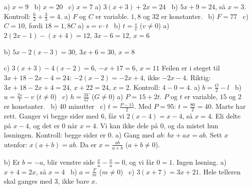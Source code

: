  a) $x = 9$ \ b) $x = 20$ \ c) $x = 7$
 a) $3(x+3) + 2x = 24$ \ b) $5x + 9 = 24$, så $x = 3$. Kontroll: $\frac{6}{2} + \frac{3}{3} = 4$.
 a) $F$ og $C$ er variable. $1{,}8$ og $32$ er konstanter. \ b) $F = 77$ \ c) $C = 10$, fordi $18 = 1{,}8C$
 a) $s = v \cdot t$ \ b) $t = \frac{s}{v}$ ($v \neq 0$)
 a) $2(2x-1) - (x+4) = 12$, $3x - 6 = 12$, $x = 6$\par
b) $5x - 2(x-3) = 30$, $3x + 6 = 30$, $x = 8$\par
c) $3(x+3) - 4(x-2) = 6$, $-x + 17 = 6$, $x = 11$
 Feilen er i steget til $3x + 18 - 2x - 4 = 24$: $-2(x-2) = -2x + 4$, ikke $-2x - 4$. Riktig: $3x + 18 - 2x + 4 = 24$, $x + 22 = 24$, $x = 2$. Kontroll: $4 - 0 = 4$.
 a) $b = \frac{O}{2} - l$ \ b) $u = \frac{2s}{t} - v$ ($t \neq 0$) \ c) $h = \frac{3V}{G}$ ($G \neq 0$)
 a) $P = 15 + 2t$. $P$ og $t$ er variable, $15$ og $2$ er konstanter. \ b) 40 minutter \ c) $t = \frac{P-15}{2}$. Med $P = 95$: $t = \frac{80}{2} = 40$.
 Marte har rett. Ganger vi begge sider med 6, får vi $2(x-4) = x-4$, så $x = 4$. Eli delte på $x-4$, og det er 0 når $x = 4$. Vi kan ikke dele på 0, og da mistet hun løsningen. Kontroll: begge sider er $0$.
 a) Gang med $ab$: $bx + ax = ab$. Sett $x$ utenfor: $x(a+b) = ab$. Da er $x = \frac{ab}{a+b}$ ($a + b \neq 0$).\par
b) Er $b = -a$, blir venstre side $\frac{x}{a} - \frac{x}{a} = 0$, og vi får $0 = 1$. Ingen løsning.
 a) $x + 4 = 2x$, så $x = 4$ \ b) $a = \frac{F}{m}$ ($m \neq 0$) \ c) $3(x+7) = 3x + 21$. Hele telleren skal ganges med 3, ikke bare $x$.

